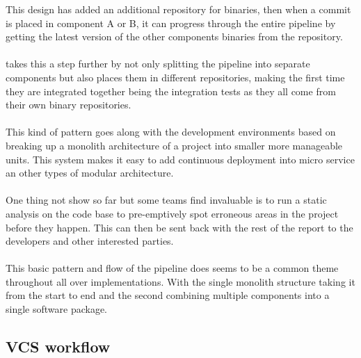 This design has added an additional repository for binaries, then when a commit is placed in component A or B, it can progress through the entire pipeline by getting the latest version of the other components binaries from the repository. 
\\\\
\cite{thoughworks} takes this a step further by not only splitting the pipeline into separate components  but also places them in different repositories, making the first time they are integrated together being the integration tests as they all come from their own binary repositories.
\\\\
This kind of pattern goes along with the development environments based on breaking up a monolith architecture of a project into smaller more manageable units. This system makes it easy to add continuous deployment into micro service an other types of modular architecture.
\\\\
One thing not show so far but some teams find invaluable is to run a static analysis on the code base to pre-emptively spot erroneous areas in the project before they happen. This can then be sent back with the rest of the report to the developers and other interested parties.
\\\\
This basic pattern and flow of the pipeline does seems to be a common theme throughout all over implementations.  With the single monolith structure taking it from the start to end and the second combining multiple components into a single software package. 

\subsection{VCS workflow}

